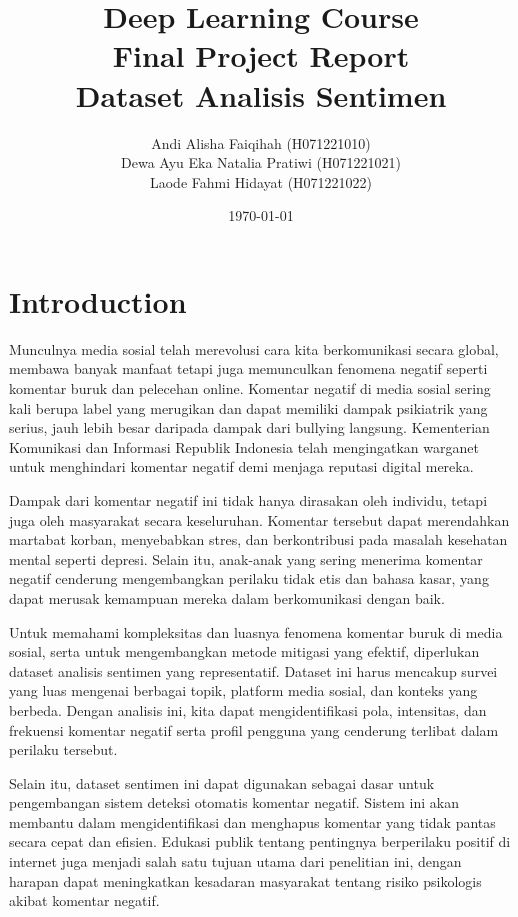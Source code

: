 \documentclass[12pt,a4paper]{article}
\title{\textbf{Deep Learning Course \\ Final Project Report \\ Dataset Analisis Sentimen}}
\author{Andi Alisha Faiqihah (H071221010)\\ Dewa Ayu Eka Natalia Pratiwi (H071221021)\\ Laode Fahmi Hidayat (H071221022)}
\date{\today}
\begin{document}
\maketitle

\newpage
\tableofcontents
\newpage

\section{Introduction}

Munculnya media sosial telah merevolusi cara kita berkomunikasi secara global, membawa banyak manfaat tetapi juga memunculkan fenomena negatif seperti komentar buruk dan pelecehan online. Komentar negatif di media sosial sering kali berupa label yang merugikan dan dapat memiliki dampak psikiatrik yang serius, jauh lebih besar daripada dampak dari bullying langsung. Kementerian Komunikasi dan Informasi Republik Indonesia telah mengingatkan warganet untuk menghindari komentar negatif demi menjaga reputasi digital mereka.

Dampak dari komentar negatif ini tidak hanya dirasakan oleh individu, tetapi juga oleh masyarakat secara keseluruhan. Komentar tersebut dapat merendahkan martabat korban, menyebabkan stres, dan berkontribusi pada masalah kesehatan mental seperti depresi. Selain itu, anak-anak yang sering menerima komentar negatif cenderung mengembangkan perilaku tidak etis dan bahasa kasar, yang dapat merusak kemampuan mereka dalam berkomunikasi dengan baik.

Untuk memahami kompleksitas dan luasnya fenomena komentar buruk di media sosial, serta untuk mengembangkan metode mitigasi yang efektif, diperlukan dataset analisis sentimen yang representatif. Dataset ini harus mencakup survei yang luas mengenai berbagai topik, platform media sosial, dan konteks yang berbeda. Dengan analisis ini, kita dapat mengidentifikasi pola, intensitas, dan frekuensi komentar negatif serta profil pengguna yang cenderung terlibat dalam perilaku tersebut.

Selain itu, dataset sentimen ini dapat digunakan sebagai dasar untuk pengembangan sistem deteksi otomatis komentar negatif. Sistem ini akan membantu dalam mengidentifikasi dan menghapus komentar yang tidak pantas secara cepat dan efisien. Edukasi publik tentang pentingnya berperilaku positif di internet juga menjadi salah satu tujuan utama dari penelitian ini, dengan harapan dapat meningkatkan kesadaran masyarakat tentang risiko psikologis akibat komentar negatif.
\end{document}
